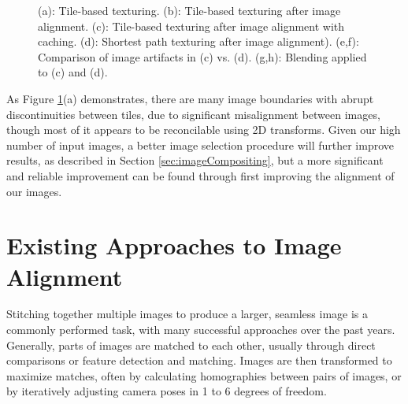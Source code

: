 \documentclass[]{spie}  %
\begin{document}
\begin{figure}
  \centering {}

  \caption{(a): Tile-based texturing. (b): Tile-based texturing after
    image alignment. (c): Tile-based texturing after image alignment
    with caching. (d): Shortest path texturing after image
    alignment). (e,f): Comparison of image artifacts in (c)
    vs. (d). (g,h): Blending applied to (c) and (d).}
  \label{fig:compareAll}
\end{figure}


As Figure \ref{fig:compareAll}(a) demonstrates, there are many image
boundaries with abrupt discontinuities between tiles, due to
significant misalignment between images, though most of it appears to
be reconcilable using 2D transforms. Given our high number of input
images, a better image selection procedure will further improve
results, as described in Section \ref{sec:imageCompositing}, but a
more significant and reliable improvement can be found through first
improving the alignment of our images.


\section{Existing Approaches to Image Alignment}
\label{sec:existingApproaches}
Stitching together multiple images to produce a larger, seamless image
is a commonly performed task, with many successful approaches over the
past years. Generally, parts of images are matched to each other,
usually through direct comparisons or feature detection and
matching. Images are then transformed to maximize matches, often by
calculating homographies between pairs of images, or by iteratively
adjusting camera poses in 1 to 6 degrees of freedom.
\end{document}
